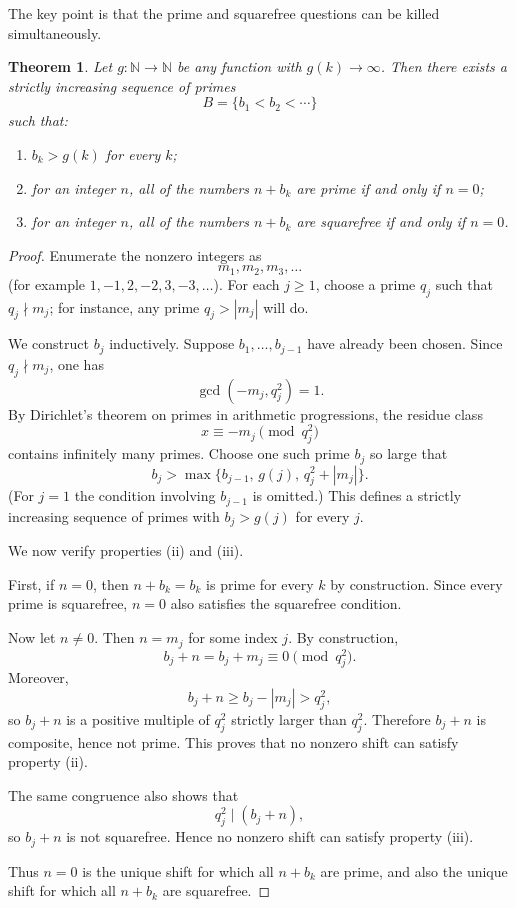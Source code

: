 \documentclass[11pt]{article}
\newif\ifuseenumitem
\newenvironment{romanparts}
    {\ifuseenumitem
      \begin{enumerate}[label=\textup{(\roman*)}]\else
        \begin{enumerate}\renewcommand{\labelenumi}{\textup{(\roman{enumi})}}\fi}
            {
          \end{enumerate}}
\newtheorem{theorem}{Theorem}[section]
\theoremstyle{remark}
\begin{document}
        The key point is that the prime and squarefree questions can be killed simultaneously.

        \begin{theorem}\label{thm:main-diagonal}
          Let $g\colon \mathbb N\to\mathbb N$ be any function with $g(k)\to\infty$. Then there exists a strictly increasing sequence of primes
          \[
            B=\{b_1<b_2<\cdots\}
          \]
          such that:
          \begin{romanparts}
          \item $b_k>g(k)$ for every $k$;
          \item for an integer $n$, all of the numbers $n+b_k$ are prime if and only if $n=0$;
          \item for an integer $n$, all of the numbers $n+b_k$ are squarefree if and only if $n=0$.
          \end{romanparts}
        \end{theorem}

        \begin{proof}
          Enumerate the nonzero integers as
          \[
            m_1,m_2,m_3,\dots
          \]
          (for example $1,-1,2,-2,3,-3,\dots$). For each $j\ge 1$, choose a prime $q_j$ such that $q_j\nmid m_j$; for instance, any prime $q_j>|m_j|$ will do.

          We construct $b_j$ inductively. Suppose $b_1,\dots,b_{j-1}$ have already been chosen. Since $q_j\nmid m_j$, one has
          \[
            \gcd(-m_j,q_j^2)=1.
          \]
          By Dirichlet's theorem on primes in arithmetic progressions, the residue class
          \[
            x\equiv -m_j \pmod{q_j^2}
          \]
          contains infinitely many primes. Choose one such prime $b_j$ so large that
          \[
            b_j>\max\{b_{j-1},\,g(j),\,q_j^2+|m_j|\}.
          \]
          (For $j=1$ the condition involving $b_{j-1}$ is omitted.) This defines a strictly increasing sequence of primes with $b_j>g(j)$ for every $j$.

          We now verify properties \textup{(ii)} and \textup{(iii)}.

          First, if $n=0$, then $n+b_k=b_k$ is prime for every $k$ by construction. Since every prime is squarefree, $n=0$ also satisfies the squarefree condition.

          Now let $n\ne 0$. Then $n=m_j$ for some index $j$. By construction,
          \[
            b_j+n=b_j+m_j\equiv 0 \pmod{q_j^2}.
          \]
          Moreover,
          \[
            b_j+n\ge b_j-|m_j|>q_j^2,
          \]
          so $b_j+n$ is a positive multiple of $q_j^2$ strictly larger than $q_j^2$. Therefore $b_j+n$ is composite, hence not prime. This proves that no nonzero shift can satisfy property \textup{(ii)}.

          The same congruence also shows that
          \[
            q_j^2\mid (b_j+n),
          \]
          so $b_j+n$ is not squarefree. Hence no nonzero shift can satisfy property \textup{(iii)}.

          Thus $n=0$ is the unique shift for which all $n+b_k$ are prime, and also the unique shift for which all $n+b_k$ are squarefree.
        \end{proof}
\end{document}
